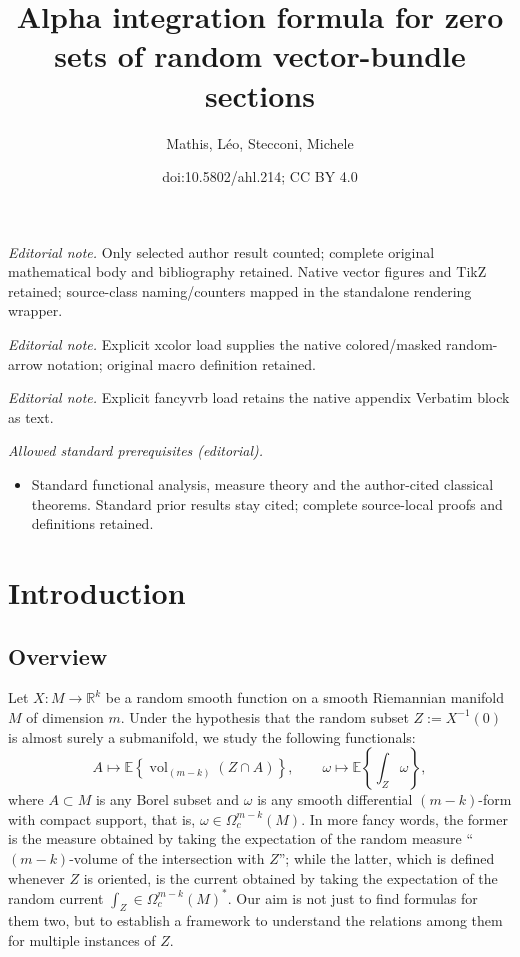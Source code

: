 \documentclass[10pt]{amsart}
\title{Alpha integration formula for zero sets of random vector-bundle sections}
\author{Mathis, Léo, Stecconi, Michele}
\date{doi:10.5802/ahl.214; CC BY 4.0}
\theoremstyle{definition}\newtheorem{defi}[theo]{Definition}\newtheorem{rema}[theo]{Remark}\newtheorem{exam}[theo]{Example}\newtheorem{exem}[theo]{Example}\newtheorem{nota}[theo]{Notation}
\newcommand{\R}{\mathbb{R}}
\newcommand{\EE}{\mathbb{E}}
\DeclareMathOperator{\vol}{vol}
\begin{document}
\maketitle
\noindent\textit{Editorial note.} Only selected author result counted; complete original mathematical body and bibliography retained. Native vector figures and TikZ retained; source-class naming/counters mapped in the standalone rendering wrapper.\par\medskip
\noindent\textit{Editorial note.} Explicit xcolor load supplies the native colored/masked random-arrow notation; original macro definition retained.\par\medskip
\noindent\textit{Editorial note.} Explicit fancyvrb load retains the native appendix Verbatim block as text.\par\medskip
\noindent\textit{Allowed standard prerequisites (editorial).}\begin{itemize}
\item Standard functional analysis, measure theory and the author-cited classical theorems. Standard prior results stay cited; complete source-local proofs and definitions retained.
\end{itemize}\medskip

\section{Introduction}\label{sec:intro}
\subsection{Overview}

Let $X\colon M\to \R^k$ be a random smooth function on a smooth Riemannian manifold $M$ of dimension $m$. Under the hypothesis that the random subset $Z:=X^{-1}(0)$ is almost surely a submanifold, we study the following functionals:
\begin{equation}\label{eq:rhoalpha1}
A\mapsto\EE\left\{\vol_{(m-k)}(Z\cap A)\right\}, \qquad \omega\mapsto \EE\left\{\int_{Z} \omega\right\},
\end{equation}
where $A\subset M$ is any Borel subset and $\omega$ is any smooth differential $(m-k)$-form with compact support, that is, $\omega\in \Omega_c^{m-k}(M)$. In more fancy words, the former is the measure obtained by taking the expectation of the random measure ``$(m-k)$-volume of the intersection with $Z$''; while the latter, which is defined whenever $Z$ is oriented, is the current obtained by taking the expectation of the random current $\int_Z\in \Omega_c^{m-k}(M)^*$. Our aim is not just to find formulas for them two, but to establish a framework to understand the relations among them for multiple instances of $Z$.
\end{document}
